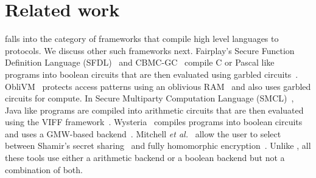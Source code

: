 \section{Related work}
\label{sec:related}

 
\tool falls into the category of frameworks that compile high level languages to \mpc protocols. We discuss other such frameworks next.
Fairplay's Secure Function Definition Language (SFDL)~\cite{fairplay,fairplaymp} and CBMC-GC~\cite{cbmcgc} compile C or Pascal like programs into boolean circuits that are then evaluated using garbled circuits~\cite{yao}.
ObliVM~\cite{oblivm} protects access patterns using an oblivious RAM~\cite{oram1,oram2} and also uses garbled circuits for compute.
In Secure Multiparty Computation Language (SMCL)~\cite{smcl},  Java like programs are compiled into arithmetic circuits that are then evaluated using the VIFF framework~\cite{viff}. Wysteria~\cite{wysteria} compiles  programs into boolean circuits and uses a GMW-based backend~\cite{choi,gmw}. 
 Mitchell {\em et al.}~\cite{lambdaps} allow the user to select between Shamir's secret sharing~\cite{sss} and fully homomorphic encryption~\cite{gentry}.  Unlike \tool, all these tools use either a arithmetic backend or a boolean backend but not a combination of both.

